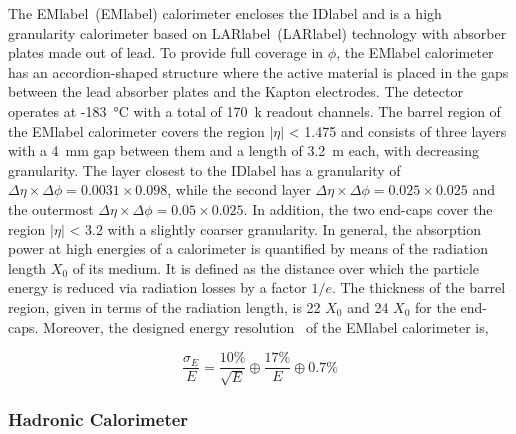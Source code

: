 The \acrlong{EMlabel}~(\acrshort{EMlabel}) calorimeter encloses the \acrshort{IDlabel} and is a high granularity calorimeter based on \acrlong{LARlabel}~(\acrshort{LARlabel}) technology with absorber plates made out of lead. To provide full coverage in $\phi$, the \acrshort{EMlabel} calorimeter has an accordion-shaped structure where the active material is placed in the gaps between the lead absorber plates and the Kapton electrodes. The detector operates at -183~°C with a total of 170~k readout channels. The barrel region of the \acrshort{EMlabel} calorimeter covers the region $|\eta|$ < 1.475 and consists of three layers with a 4~mm gap between them and a length of 3.2~m each, with decreasing granularity. The layer closest to the \acrshort{IDlabel} has a granularity of $\Delta\eta\times\Delta\phi= 0.0031\times 0.098$, while the second layer $\Delta\eta\times\Delta\phi= 0.025\times 0.025$ and the outermost $\Delta\eta\times\Delta\phi= 0.05\times 0.025$. In addition, the two end-caps cover the region $|\eta|$ < 3.2 with a slightly coarser granularity. In general, the absorption power at high energies of a calorimeter is quantified by means of the radiation length $X_0$ of its medium. It is defined as the distance over which the particle energy is reduced via radiation losses by a factor $1/e$. The thickness of the barrel region, given in terms of the radiation length, is 22 $X_0$ and 24 $X_0$ for the end-caps. Moreover, the designed energy resolution~\cite{Collaboration_2008} of the \acrshort{EMlabel} calorimeter is,

\begin{equation}
    \frac{\sigma_E}{E} = \frac{10\%}{\sqrt{E}}\oplus\frac{17\%}{E}\oplus 0.7\%
\end{equation}

\subsubsection*{Hadronic Calorimeter}

